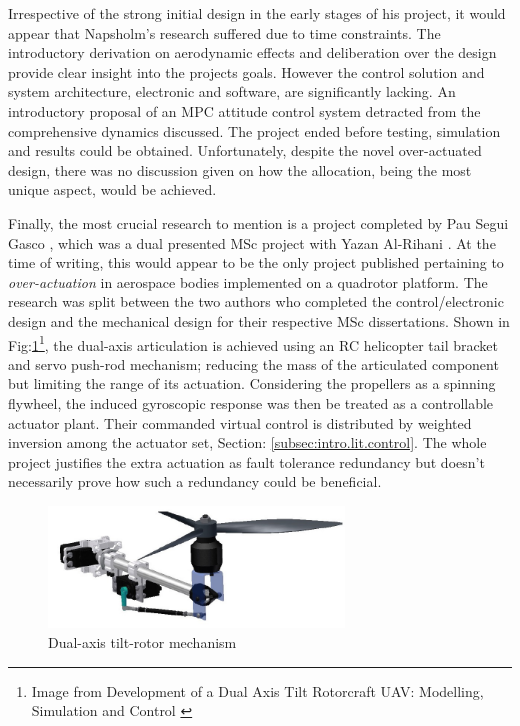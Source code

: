 \par
Irrespective of the strong initial design in the early stages of his project, it would appear that Napsholm's research suffered due to time constraints. The introductory derivation on aerodynamic effects and deliberation over the design provide clear insight into the projects goals. However the control solution and system architecture, electronic and software, are significantly lacking. An introductory proposal of an MPC attitude control system detracted from the comprehensive dynamics discussed. The project ended before testing, simulation and results could be obtained. Unfortunately, despite the novel over-actuated design, there was no discussion given on how the allocation, being the most unique aspect, would be achieved.
\par
Finally, the most crucial research to mention is a project completed by Pau Segui Gasco \cite{tiltgasco}, which was a dual presented MSc project with Yazan Al-Rihani \cite{tiltrihani}. At the time of writing, this would appear to be the only project published pertaining to \emph{over-actuation} in aerospace bodies implemented on a quadrotor platform. The research was split between the two authors who completed the control/electronic design and the mechanical design for their respective MSc dissertations. Shown in Fig:\ref{fig:tiltrotor-gasco}\footnote{Image from Development of a Dual Axis Tilt Rotorcraft UAV: Modelling, Simulation and Control \cite{tiltgasco}}, the dual-axis articulation is achieved using an RC helicopter tail bracket and servo push-rod mechanism; reducing the mass of the articulated component but limiting the range of its actuation. Considering the propellers as a spinning flywheel, the induced gyroscopic response was then be treated as a controllable actuator plant. Their commanded virtual control is distributed by weighted inversion among the actuator set, Section: \ref{subsec:intro.lit.control}. The whole project justifies the extra actuation as fault tolerance redundancy but doesn't necessarily prove how such a redundancy could be beneficial.
\begin{figure}[htbp]
\centering
\includegraphics[width=0.7\textwidth]{figs/gasco-mech}
\caption{Dual-axis tilt-rotor mechanism}
\label{fig:tiltrotor-gasco}
\end{figure}
